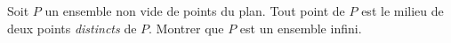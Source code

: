 Soit $P$ un ensemble non vide de points du plan. Tout point de $P$ est le
milieu de deux points \emph{distincts} de $P$. Montrer que $P$ est un ensemble infini.
